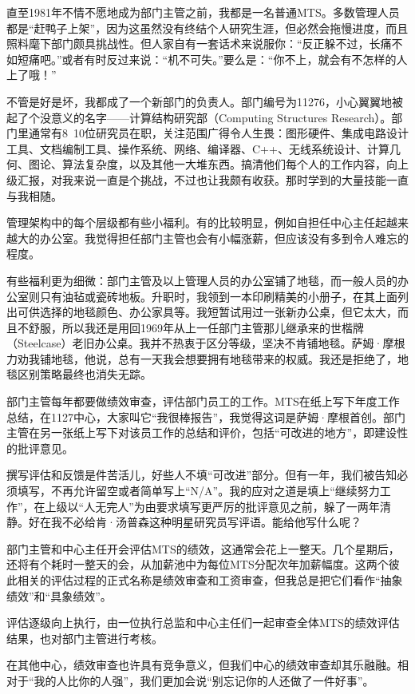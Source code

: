 \documentclass[a4paper,12pt,UTF8,twoside]{ctexbook}
\begin{document}
直至1981年不情不愿地成为部门主管之前，我都是一名普通MTS。多数管理人员都是“赶鸭子上架”，因为这虽然没有终结个人研究生涯，但必然会拖慢进度，而且照料麾下部门颇具挑战性。但人家自有一套话术来说服你：“反正躲不过，长痛不如短痛吧。”或者有时反过来说：“机不可失。”要么是：“你不上，就会有不怎样的人上了哦！”

不管是好是坏，我都成了一个新部门的负责人。部门编号为11276，小心翼翼地被起了个没意义的名字——计算结构研究部（Computing Structures Research）。部门里通常有8~10位研究员在职，关注范围广得令人生畏：图形硬件、集成电路设计工具、文档编制工具、操作系统、网络、编译器、C++、无线系统设计、计算几何、图论、算法复杂度，以及其他一大堆东西。搞清他们每个人的工作内容，向上级汇报，对我来说一直是个挑战，不过也让我颇有收获。那时学到的大量技能一直与我相随。

管理架构中的每个层级都有些小福利。有的比较明显，例如自担任中心主任起越来越大的办公室。我觉得担任部门主管也会有小幅涨薪，但应该没有多到令人难忘的程度。

有些福利更为细微：部门主管及以上管理人员的办公室铺了地毯，而一般人员的办公室则只有油毡或瓷砖地板。升职时，我领到一本印刷精美的小册子，在其上面列出可供选择的地毯颜色、办公家具等。我短暂试用过一张新办公桌，但它太大，而且不舒服，所以我还是用回1969年从上一任部门主管那儿继承来的世楷牌（Steelcase）老旧办公桌。我并不热衷于区分等级，坚决不肯铺地毯。萨姆·摩根力劝我铺地毯，他说，总有一天我会想要拥有地毯带来的权威。我还是拒绝了，地毯区别策略最终也消失无踪。

部门主管每年都要做绩效审查，评估部门员工的工作。MTS在纸上写下年度工作总结，在1127中心，大家叫它“我很棒报告”，我觉得这词是萨姆·摩根首创。部门主管在另一张纸上写下对该员工作的总结和评价，包括“可改进的地方”，即建设性的批评意见。

撰写评估和反馈是件苦活儿，好些人不填“可改进”部分。但有一年，我们被告知必须填写，不再允许留空或者简单写上“N/A”。我的应对之道是填上“继续努力工作”，在上级以“人无完人”为由要求填写更严厉的批评意见之前，躲了一两年清静。好在我不必给肯·汤普森这种明星研究员写评语。能给他写什么呢？

部门主管和中心主任开会评估MTS的绩效，这通常会花上一整天。几个星期后，还将有个耗时一整天的会，从加薪池中为每位MTS分配次年加薪幅度。这两个彼此相关的评估过程的正式名称是绩效审查和工资审查，但我总是把它们看作“抽象绩效”和“具象绩效”。

评估逐级向上执行，由一位执行总监和中心主任们一起审查全体MTS的绩效评估结果，也对部门主管进行考核。

在其他中心，绩效审查也许具有竞争意义，但我们中心的绩效审查却其乐融融。相对于“我的人比你的人强”，我们更加会说“别忘记你的人还做了一件好事”。
\end{document}
